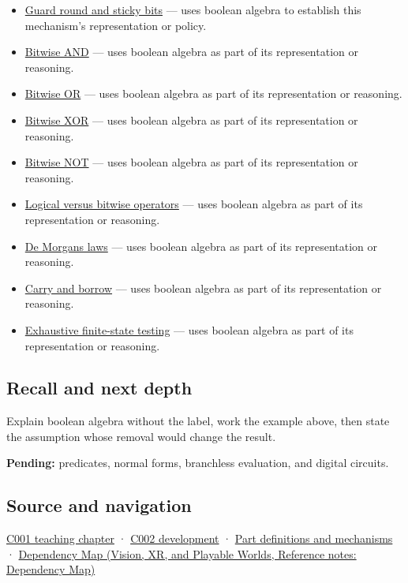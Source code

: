 \begin{itemize}
\item
  \hyperref[appendix-b572b631069b]{Guard round and sticky bits} --- uses boolean algebra to establish this mechanism's representation or policy.
\item
  \hyperref[appendix-68b52453737c]{Bitwise AND} --- uses boolean algebra as part of its representation or reasoning.
\item
  \hyperref[appendix-a427ce8ce8a6]{Bitwise OR} --- uses boolean algebra as part of its representation or reasoning.
\item
  \hyperref[appendix-d49161831368]{Bitwise XOR} --- uses boolean algebra as part of its representation or reasoning.
\item
  \hyperref[appendix-8f38927cfc54]{Bitwise NOT} --- uses boolean algebra as part of its representation or reasoning.
\item
  \hyperref[appendix-fe6b457d68d8]{Logical versus bitwise operators} --- uses boolean algebra as part of its representation or reasoning.
\item
  \hyperref[appendix-9079d3659da4]{De Morgan\textquotesingle s laws} --- uses boolean algebra as part of its representation or reasoning.
\item
  \hyperref[appendix-d52d5f78ffd1]{Carry and borrow} --- uses boolean algebra as part of its representation or reasoning.
\item
  \hyperref[appendix-05db24ccc28a]{Exhaustive finite-state testing} --- uses boolean algebra as part of its representation or reasoning.
\end{itemize}

\subsection{Recall and next depth}\label{appendix-24475e1596a8-recall-and-next-depth}

Explain boolean algebra without the label, work the example above, then state the assumption whose removal would change the result.

\textbf{Pending:} predicates, normal forms, branchless evaluation, and digital circuits.

\subsection{Source and navigation}\label{appendix-24475e1596a8-source-and-navigation}

\hyperref[01-foundations-i-ch001-from-a-signal-to-an-interpretation]{C001 teaching chapter} · \hyperref[01-foundations-i-ch001-arithmetic-becomes-a-policy]{C002 development} · \hyperref[appendix-fd090d982a15]{Part definitions and mechanisms} · \href{../07-Vision-XR-and-Playable-Worlds/main.pdf\#nameddest=appendix-4ad47bdd269a}{Dependency Map (Vision, XR, and Playable Worlds, Reference notes: Dependency Map)}
